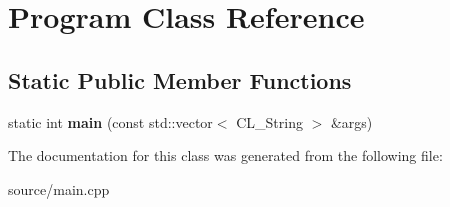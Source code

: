 \hypertarget{classProgram}{
\section{Program Class Reference}
\label{classProgram}
}
\subsection*{Static Public Member Functions}
\begin{DoxyCompactItemize}
\item 
\hypertarget{classProgram_a97eed8197e64916a57f1d89477932d7a}{
static int {\bfseries main} (const std::vector$<$ CL\_\-String $>$ \&args)}
\label{classProgram_a97eed8197e64916a57f1d89477932d7a}

\end{DoxyCompactItemize}


The documentation for this class was generated from the following file:\begin{DoxyCompactItemize}
\item 
source/main.cpp\end{DoxyCompactItemize}
